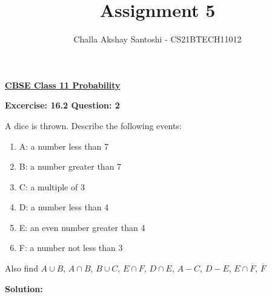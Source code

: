 \documentclass[journal,12pt,twocolumn]{IEEEtran}
\begin{document}
\newcommand{\myvec}[1]{\ensuremath{\begin{pmatrix}#1\end{pmatrix}}}
\newcommand{\mydet}[1]{\ensuremath{\begin{vmatrix}#1\end{vmatrix}}}
\makeatletter
{}
\makeatother
\let\StandardTheFigure\thefigure
\let\vec\mathbf
\renewcommand{\thefigure}{\theproblem}
\def\putbox#1#2#3{\makebox[0in][l]{\makebox[#1][l]{}\raisebox{\baselineskip}[0in][0in]{\raisebox{#2}[0in][0in]{#3}}}}
     \def\rightbox#1{\makebox[0in][r]{#1}}
     \def\centbox#1{\makebox[0in]{#1}}
     \def\topbox#1{\raisebox{-\baselineskip}[0in][0in]{#1}}
     \def\midbox#1{\raisebox{-0.5\baselineskip}[0in][0in]{#1}}
\vspace{3cm}
\title{Assignment 5}
\author{Challa Akshay Santoshi - CS21BTECH11012}
\maketitle
\newpage
\bigskip
\renewcommand{\thefigure}{\theenumi}
\renewcommand{\thetable}{\theenumi}
\begin{center}
  \textbf{\underline{CBSE Class 11 Probability}}\\
\end{center}
\begin{center}
  \textbf{Excercise: 16.2 Question: 2}  
\end{center}
A dice is thrown. Describe the following events:
\begin{enumerate}
	\item A: a number less than 7
	\item B: a number greater than 7
	\item C: a multiple of 3
	\item D: a number less than 4
	\item E: an even number greater than 4
	\item F: a number not less than 3
\end{enumerate}
Also find $A \cup B $, $A \cap B$, $B \cup C$, $E \cap F$, $D \cap E$, $A - C$, $D - E$, $E \cap \overline{F}$, $\overline{F}$
\begin{center}
  \textbf{Solution:}  
\end{center}
\end{document}
